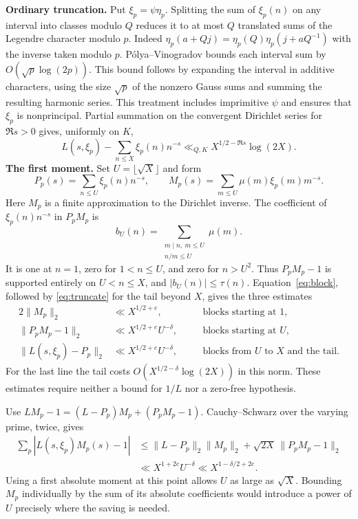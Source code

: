 \documentclass[11pt,letterpaper]{article}
\begin{document}
\textbf{Ordinary truncation.} Put $\xi_p=\psi\eta_p$. Splitting the sum of $\xi_p(n)$ on any interval into classes modulo $Q$ reduces it to at most $Q$ translated sums of the Legendre character modulo $p$. Indeed $\eta_p(a+Qj)=\eta_p(Q)\eta_p(j+a Q^{-1})$ with the inverse taken modulo $p$. Pólya--Vinogradov bounds each interval sum by $O(\sqrt p\log(2p))$. This bound follows by expanding the interval in additive characters, using the size $\sqrt p$ of the nonzero Gauss sums and summing the resulting harmonic series. This treatment includes imprimitive $\psi$ and ensures that $\xi_p$ is nonprincipal. Partial summation on the convergent Dirichlet series for $\Re s>0$ gives, uniformly on $K$,
\begin{equation}
 L(s,\xi_p)-\sum_{n\le X}\xi_p(n)n^{-s}
       \ll_{Q,K} X^{1/2-\Re s}\log(2X).\label{eq:truncate}
\end{equation}
\newpage\textbf{The first moment.} Set $U=\lfloor\sqrt X\rfloor$ and form
\[
 P_p(s)=\sum_{n\le U}\xi_p(n)n^{-s},\qquad
 M_p(s)=\sum_{m\le U}\mu(m)\xi_p(m)m^{-s}.
\]
Here $M_p$ is a finite approximation to the Dirichlet inverse. The coefficient of $\xi_p(n)n^{-s}$ in $P_pM_p$ is
\begin{equation}
 b_U(n)=\sum_{\substack{m\mid n,\ m\le U\\ n/m\le U}}\mu(m).
 \label{eq:mob}
\end{equation}
It is one at $n=1$, zero for $1<n\le U$, and zero for $n>U^2$. Thus $P_pM_p-1$ is supported entirely on $U<n\le X$, and $|b_U(n)|\le\tau(n)$. Equation~\eqref{eq:block}, followed by \eqref{eq:truncate} for the tail beyond $X$, gives the three estimates
\begin{alignat}{2}
 \|M_p\|_2&\ll X^{1/2+e}, &\quad&
       \text{blocks starting at }1,\nonumber\\
 \|P_pM_p-1\|_2&\ll X^{1/2+e}U^{-\delta}, &&
       \text{blocks starting at }U,\label{eq:three}\\
 \|L(s,\xi_p)-P_p\|_2&\ll X^{1/2+e}U^{-\delta}, &&
       \text{blocks from }U\text{ to }X\text{ and the tail}.\nonumber
\end{alignat}
For the last line the tail costs $O(X^{1/2-\delta}\log(2X))$ in this norm. These estimates require neither a bound for $1/L$ nor a zero-free hypothesis.

Use $LM_p-1=(L-P_p)M_p+(P_pM_p-1)$. Cauchy--Schwarz over the varying prime, twice, gives
\begin{align}
 \sum_p|L(s,\xi_p)M_p(s)-1|
 &\le \|L-P_p\|_2\|M_p\|_2+\sqrt{2X}\,\|P_pM_p-1\|_2\nonumber\\
 &\ll X^{1+2e} U^{-\delta}\ll X^{1-\delta/2+2e}.
 \label{eq:first}
\end{align}
Using a first absolute moment at this point allows $U$ as large as $\sqrt X$. Bounding $M_p$ individually by the sum of its absolute coefficients would introduce a power of $U$ precisely where the saving is needed.
\end{document}
